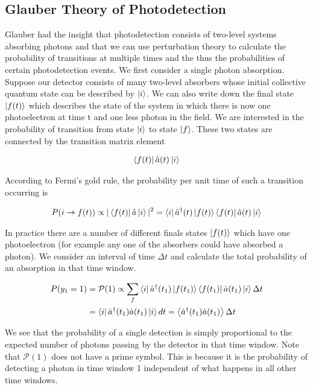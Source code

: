 \documentclass[12pt]{article}
\begin{document}
\subsection{Glauber Theory of Photodetection}

Glauber had the insight that photodetection consists of two-level systems absorbing photons and that we can use perturbation theory to calculate the probability of transitions at multiple times and the thus the probabilities of certain photodetection events. We first consider a single photon absorption. Suppose our detector consists of many two-level absorbers whose initial collective quantum state can be described by $\ket{i}$. We can also write down the final state $\ket{f(t)}$ which describes the state of the system in which there is now one photoelectron at time t and one less photon in the field. We are interested in the probability of transition from state $\ket{i}$ to state $\ket{f}$. These two states are connected by the transition matrix element

\begin{align}
\bra{f(t)}\hat{a}(t)\ket{i}
\end{align}

According to Fermi's gold rule, the probability per unit time of such a transition occurring is

\begin{align}
P(i \rightarrow f(t)) \propto |\bra{f(t)}\hat{a}\ket{i}|^2 = \bra{i} \hat{a}^{\dag}(t) \ket{f(t)}\bra{f(t)}\hat{a}(t)\ket{i}
\end{align}

In practice there are a number of different finals states $\ket{f(t)}$ which have one photoelectron (for example any one of the absorbers could have absorbed a photon). We consider an interval of time $\Delta t$ and calculate the total probability of an absorption in that time window.

\begin{align}
P(y_{1}=1) &= \mathcal{P}(1) \propto \sum_f \bra{i} \hat{a}^{\dag}(t_{1})\ket{f(t_{1})}\bra{f(t_{1})}\hat{a}(t_{1}) \ket{i}\Delta t\\
&= \bra{i} \hat{a}^{\dag}(t_{1}) \hat{a}(t_{1}) \ket{i}dt = \Braket{\hat{a}^{\dag}(t_1) \hat{a}(t_1)}\Delta t
\end{align}

We see that the probability of a single detection is simply proportional to the expected number of photons passing by the detector in that time window. Note that $\mathcal{P}(1)$ does not have a prime symbol. This is because it is the probability of detecting a photon in time window 1 independent of what happens in all other time windows.
\end{document}
